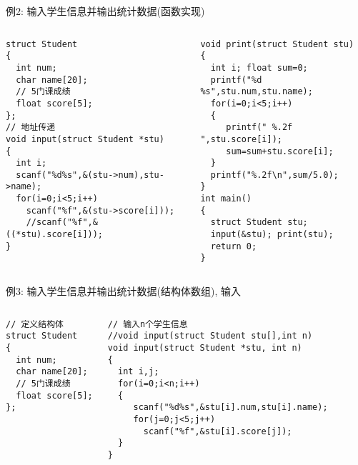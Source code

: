 \begin{frame}{例2: 输入学生信息并输出统计数据(函数实现)}
\begin{columns}[T]
\begin{lstlisting}
struct Student 
{ 
  int num;
  char name[20];
  // 5门课成绩
  float score[5];
};
// 地址传递
void input(struct Student *stu)
{
  int i;
  scanf("%d%s",&(stu->num),stu->name);
  for(i=0;i<5;i++) 
    scanf("%f",&(stu->score[i])); 
    //scanf("%f",&((*stu).score[i]));
}
\end{lstlisting}
\begin{lstlisting}
void print(struct Student stu)
{
  int i; float sum=0;
  printf("%d %s",stu.num,stu.name);
  for(i=0;i<5;i++)
  { 
     printf(" %.2f ",stu.score[i]);
     sum=sum+stu.score[i];
  }
  printf("%.2f\n",sum/5.0);
}
int main()
{ 
  struct Student stu;
  input(&stu); print(stu); 
  return 0;
}
\end{lstlisting}
\end{columns}
\medskip
\end{frame}

\begin{frame}{例3: 输入学生信息并输出统计数据(结构体数组), 输入}
\begin{columns}[T]
\begin{lstlisting}
// 定义结构体
struct Student 
{ 
  int num;
  char name[20];
  // 5门课成绩
  float score[5];
};
\end{lstlisting}
\begin{lstlisting}
// 输入n个学生信息
//void input(struct Student stu[],int n)
void input(struct Student *stu, int n)
{
  int i,j;
  for(i=0;i<n;i++) 
  {
     scanf("%d%s",&stu[i].num,stu[i].name);
     for(j=0;j<5;j++) 
       scanf("%f",&stu[i].score[j]);
  } 
}
\end{lstlisting}
\end{columns}
\end{frame}

